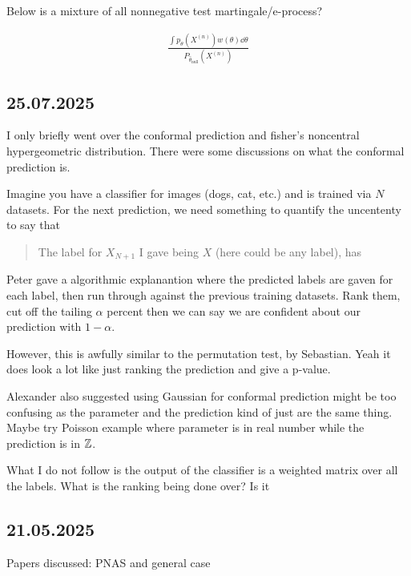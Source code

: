 \begin{question}
	Below is a mixture of all nonnegative test martingale/e-process?
\end{question}

\begin{align*}
	\frac{\int p_{\theta}(X^{(n)}) w(\theta) \dd{\theta}}{P_{\hat{\theta}_{\mathrm{null}}}(X^{(n)})}
\end{align*}


\subsection*{25.07.2025} I only briefly went over the conformal prediction and fisher's noncentral hypergeometric distribution.
There were some discussions on what the conformal prediction is.

Imagine you have a classifier for images (dogs, cat, etc.) and is trained via $N$ datasets.
For the next prediction, we need something to quantify the uncententy to say that
\begin{quote}
	The label for $X_{N+1}$ I gave being $X$ (here could be any label), has
\end{quote}

Peter gave a algorithmic explanantion where the predicted labels are gaven for each label,
then run through against the previous training datasets. Rank them, cut off the tailing $\alpha$
percent then we can say we are confident about our prediction with $1-\alpha$.

However, this is awfully similar to the permutation test, by Sebastian.
Yeah it does look a lot like just ranking the prediction and give a p-value.

Alexander also suggested using Gaussian for conformal prediction might be too confusing
as the parameter and the prediction kind of just are the same thing.
Maybe try Poisson example where parameter is in real number while the prediction is in $\mathbb{Z}$.

What I do not follow is the output of the classifier is a weighted matrix over all the labels.
What is the ranking being done over? Is it

\subsection*{21.05.2025}

Papers discussed: PNAS and general case


